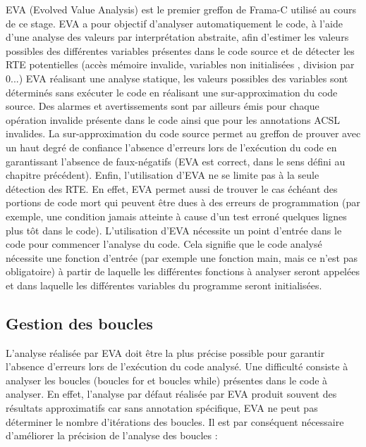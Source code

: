 EVA (Evolved Value Analysis) est le premier greffon de Frama-C utilisé au cours de ce stage. EVA a pour objectif d'analyser automatiquement le code, à l'aide d'une analyse des valeurs par interprétation abstraite, afin d'estimer les valeurs possibles des différentes variables présentes dans le code source et de détecter les RTE potentielles (accès mémoire invalide, variables non initialisées , division par 0...)
EVA réalisant une analyse statique, les valeurs possibles des variables sont déterminés sans exécuter le code en réalisant une sur-approximation du code source. Des alarmes et avertissements sont par ailleurs émis pour chaque opération invalide présente dans le code ainsi que pour les annotations ACSL invalides. La sur-approximation du code source permet au greffon de prouver avec un haut degré de confiance l'absence d'erreurs lors de l'exécution du code en garantissant l'absence de faux-négatifs (EVA est correct, dans le sens défini au chapitre précédent).
Enfin, l'utilisation d'EVA ne se limite pas à la seule détection des RTE. En effet, EVA permet aussi de trouver le cas échéant des portions de code mort qui peuvent être dues à des erreurs de programmation (par exemple, une condition jamais atteinte à cause d'un test erroné quelques lignes plus tôt dans le code).
\newline
\noindent
L'utilisation d'EVA nécessite un point d'entrée dans le code pour commencer l'analyse du code. Cela signifie que le code analysé nécessite une fonction d'entrée (par exemple une fonction main, mais ce n'est pas obligatoire) à partir de laquelle les différentes fonctions à analyser seront appelées et dans laquelle les différentes variables du programme seront initialisées.

\subsection{Gestion des boucles}
L'analyse réalisée par EVA doit être la plus précise possible pour garantir l'absence d'erreurs lors de l'exécution du code analysé. Une difficulté consiste à analyser les boucles (boucles for et boucles while) présentes dans le code à analyser. En effet, l'analyse par défaut réalisée par EVA produit souvent des résultats approximatifs car sans annotation spécifique, EVA ne peut pas déterminer le nombre d'itérations des boucles. Il est par conséquent nécessaire d'améliorer la précision de l'analyse des boucles :

